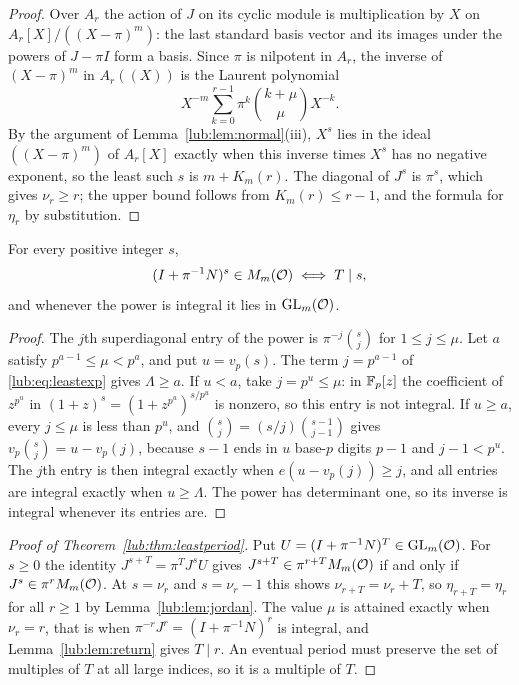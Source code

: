 \begin{proof}
Over $A_r$ the action of $J$ on its cyclic module is multiplication by $X$ on
$A_r[X]/((X-\pi)^m)$: the last standard basis vector and its images under the powers of
$J-\pi I$ form a basis. Since $\pi$ is nilpotent in $A_r$, the inverse of $(X-\pi)^m$ in
$A_r((X))$ is the Laurent polynomial
\[
 X^{-m}\sum_{k=0}^{r-1}\pi^k\binom{k+\mu}{\mu}X^{-k}.
\]
By the argument of Lemma~\ref{lub:lem:normal}(iii), $X^s$ lies in the ideal $((X-\pi)^m)$ of
$A_r[X]$ exactly when this inverse times $X^s$ has no negative exponent, so the least such $s$
is $m+K_m(r)$. The diagonal of $J^s$ is $\pi^s$, which gives $\nu_r\ge r$; the upper bound
follows from $K_m(r)\le r-1$, and the formula for $\eta_r$ by substitution.
\end{proof}

\begin{lemma}\label{lub:lem:return}
For every positive integer $s$,
\[
 (I+\pi^{-1}N)^s\in M_m(\mathcal{O})\iff T\mid s,
\]
and whenever the power is integral it lies in $\operatorname{GL}_m(\mathcal{O})$.
\end{lemma}

\begin{proof}
The $j$th superdiagonal entry of the power is $\pi^{-j}\binom sj$ for $1\le j\le\mu$. Let $a$
satisfy $p^{a-1}\le\mu<p^a$, and put $u=v_p(s)$. The term $j=p^{a-1}$ of
\eqref{lub:eq:leastexp} gives $\Lambda\ge a$. If $u<a$, take $j=p^u\le\mu$: in $\mathbb{F}_p[z]$ the
coefficient of $z^{p^u}$ in $(1+z)^s=(1+z^{p^u})^{s/p^u}$ is nonzero, so this entry is not
integral. If $u\ge a$, every $j\le\mu$ is less than $p^u$, and
$\binom sj=(s/j)\binom{s-1}{j-1}$ gives $v_p\binom sj=u-v_p(j)$, because $s-1$ ends in $u$
base-$p$ digits $p-1$ and $j-1<p^u$. The $j$th entry is then integral exactly when
$e(u-v_p(j))\ge j$, and all entries are integral exactly when $u\ge\Lambda$. The power has
determinant one, so its inverse is integral whenever its entries are.
\end{proof}

\begin{proof}[Proof of Theorem~\ref{lub:thm:leastperiod}]
Put $U=(I+\pi^{-1}N)^T\in\operatorname{GL}_m(\mathcal{O})$. For $s\ge0$ the identity $J^{s+T}=\pi^TJ^sU$ gives
$J^{s+T}\in\pi^{r+T}M_m(\mathcal{O})$ if and only if $J^s\in\pi^rM_m(\mathcal{O})$. At $s=\nu_r$ and
$s=\nu_r-1$ this shows $\nu_{r+T}=\nu_r+T$, so $\eta_{r+T}=\eta_r$ for all $r\ge1$ by
Lemma~\ref{lub:lem:jordan}. The value $\mu$ is attained exactly when $\nu_r=r$, that is when
$\pi^{-r}J^r=(I+\pi^{-1}N)^r$ is integral, and Lemma~\ref{lub:lem:return} gives $T\mid r$. An
eventual period must preserve the set of multiples of $T$ at all large indices, so it is a
multiple of $T$.
\end{proof}

